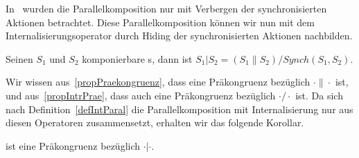 In~\cite{Vogler2014EIO} wurden die Parallelkomposition nur mit Verbergen der
synchronisierten Aktionen betrachtet. Diese Parallelkomposition können wir nun
mit dem Internalisierungsoperator durch Hiding der synchronisierten Aktionen
nachbilden.

\begin{Def}
  \label{defIntParal}
  Seinen $S_1$ und $S_2$ komponierbare \EIO{}s, dann ist
  $S_1|S_2=(S_1\|S_2)/Synch(S_1,S_2)$.
\end{Def}

Wir wissen aus~\ref{propPraekongruenz}, dass \ERel{} eine Präkongruenz
bezüglich $\cdot\|\cdot$ ist, und aus~\ref{propIntrPrae}, dass \ERel{} auch eine
Präkongruenz bezüglich $\cdot/\cdot$ ist. Da sich nach
Definition~\ref{defIntParal} die Parallelkomposition mit Internalisierung nur
aus diesen Operatoren zusammensetzt, erhalten wir das folgende Korollar.

\begin{kor}
  \ERel{} ist eine Präkongruenz bezüglich $\cdot|\cdot$.
\end{kor}
